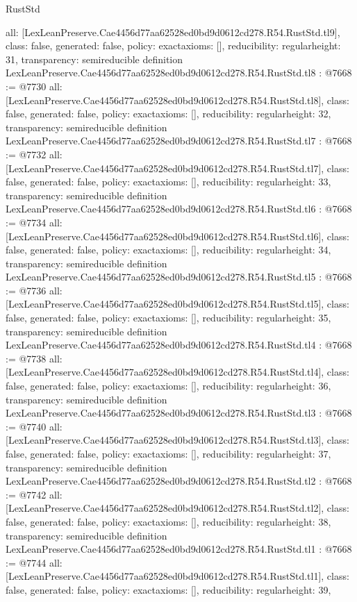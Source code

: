 \begin{lexlean}{RustStd}
\begin{coremodule}
{  all: [LexLeanPreserve.Cae4456d77aa62528ed0bd9d0612cd278.R54.RustStd.tl9],
  class: false,
  generated: false,
  policy: exact{axioms: []},
  reducibility: regular{height: 31},
  transparency: semireducible
}
definition LexLeanPreserve.Cae4456d77aa62528ed0bd9d0612cd278.R54.RustStd.tl8 : @7668 := @7730 {
  all: [LexLeanPreserve.Cae4456d77aa62528ed0bd9d0612cd278.R54.RustStd.tl8],
  class: false,
  generated: false,
  policy: exact{axioms: []},
  reducibility: regular{height: 32},
  transparency: semireducible
}
definition LexLeanPreserve.Cae4456d77aa62528ed0bd9d0612cd278.R54.RustStd.tl7 : @7668 := @7732 {
  all: [LexLeanPreserve.Cae4456d77aa62528ed0bd9d0612cd278.R54.RustStd.tl7],
  class: false,
  generated: false,
  policy: exact{axioms: []},
  reducibility: regular{height: 33},
  transparency: semireducible
}
definition LexLeanPreserve.Cae4456d77aa62528ed0bd9d0612cd278.R54.RustStd.tl6 : @7668 := @7734 {
  all: [LexLeanPreserve.Cae4456d77aa62528ed0bd9d0612cd278.R54.RustStd.tl6],
  class: false,
  generated: false,
  policy: exact{axioms: []},
  reducibility: regular{height: 34},
  transparency: semireducible
}
definition LexLeanPreserve.Cae4456d77aa62528ed0bd9d0612cd278.R54.RustStd.tl5 : @7668 := @7736 {
  all: [LexLeanPreserve.Cae4456d77aa62528ed0bd9d0612cd278.R54.RustStd.tl5],
  class: false,
  generated: false,
  policy: exact{axioms: []},
  reducibility: regular{height: 35},
  transparency: semireducible
}
definition LexLeanPreserve.Cae4456d77aa62528ed0bd9d0612cd278.R54.RustStd.tl4 : @7668 := @7738 {
  all: [LexLeanPreserve.Cae4456d77aa62528ed0bd9d0612cd278.R54.RustStd.tl4],
  class: false,
  generated: false,
  policy: exact{axioms: []},
  reducibility: regular{height: 36},
  transparency: semireducible
}
definition LexLeanPreserve.Cae4456d77aa62528ed0bd9d0612cd278.R54.RustStd.tl3 : @7668 := @7740 {
  all: [LexLeanPreserve.Cae4456d77aa62528ed0bd9d0612cd278.R54.RustStd.tl3],
  class: false,
  generated: false,
  policy: exact{axioms: []},
  reducibility: regular{height: 37},
  transparency: semireducible
}
definition LexLeanPreserve.Cae4456d77aa62528ed0bd9d0612cd278.R54.RustStd.tl2 : @7668 := @7742 {
  all: [LexLeanPreserve.Cae4456d77aa62528ed0bd9d0612cd278.R54.RustStd.tl2],
  class: false,
  generated: false,
  policy: exact{axioms: []},
  reducibility: regular{height: 38},
  transparency: semireducible
}
definition LexLeanPreserve.Cae4456d77aa62528ed0bd9d0612cd278.R54.RustStd.tl1 : @7668 := @7744 {
  all: [LexLeanPreserve.Cae4456d77aa62528ed0bd9d0612cd278.R54.RustStd.tl1],
  class: false,
  generated: false,
  policy: exact{axioms: []},
  reducibility: regular{height: 39},
}
\end{coremodule}
\end{lexlean}
